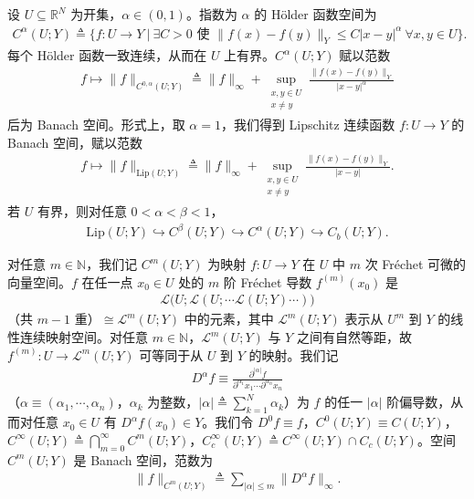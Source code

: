 \documentclass[../../main.tex]{subfiles}%
\begin{document}
\begin{definition}[Hölder 空间]\label{definition:ch04-Holder}
设 $U\subseteq\mathbb{R}^N$ 为开集，$\alpha\in(0,1)$。指数为 $\alpha$ 的 Hölder 函数空间为
\begin{align*}
C^\alpha(U;Y)\triangleq \Big\{f:U\to Y\ \Big|\ \exists C>0\text{ 使 }\|f(x)-f(y)\|_Y\leqslant C|x-y|^\alpha\ \forall x,y\in U\Big\}.
\end{align*}
每个 Hölder 函数一致连续，从而在 $U$ 上有界。$C^\alpha(U;Y)$ 赋以范数
\begin{align*}
f\mapsto\|f\|_{C^{0,\alpha}(U;Y)}\triangleq \|f\|_\infty+\sup_{\substack{x,y\in U\\x\neq y}}\frac{\|f(x)-f(y)\|_Y}{|x-y|^\alpha}
\end{align*}
后为 Banach 空间。形式上，取 $\alpha=1$，我们得到 Lipschitz 连续函数 $f:U\to Y$ 的 Banach 空间，赋以范数
\begin{align*}
f\mapsto\|f\|_{\mathrm{Lip}(U;Y)}\triangleq \|f\|_\infty+\sup_{\substack{x,y\in U\\x\neq y}}\frac{\|f(x)-f(y)\|_Y}{|x-y|}.
\end{align*}
若 $U$ 有界，则对任意 $0<\alpha<\beta<1$，
\begin{align*}
\mathrm{Lip}(U;Y)\hookrightarrow C^\beta(U;Y)\hookrightarrow C^\alpha(U;Y)\hookrightarrow C_b(U;Y).
\end{align*}
\end{definition}

对任意 $m\in\mathbb{N}$，我们记 $C^m(U;Y)$ 为映射 $f:U\to Y$ 在 $U$ 中 $m$ 次 Fréchet 可微的向量空间。$f$ 在任一点 $x_0\in U$ 处的 $m$ 阶 Fréchet 导数 $f^{(m)}(x_0)$ 是
\begin{align*}
\mathcal{L}\big(U;\mathcal{L}(U;\cdots \mathcal{L}(U;Y)\cdots )\big)
\end{align*}
（共 $m-1$ 重）$\cong\mathcal{L}^m(U;Y)$ 中的元素，其中 $\mathcal{L}^m(U;Y)$ 表示从 $U^m$ 到 $Y$ 的线性连续映射空间。对任意 $m\in\mathbb{N}$，$\mathcal{L}^m(U;Y)$ 与 $Y$ 之间有自然等距，故 $f^{(m)}:U\to\mathcal{L}^m(U;Y)$ 可等同于从 $U$ 到 $Y$ 的映射。我们记
\begin{align*}
D^\alpha f\equiv\frac{\partial^{|\alpha|}f}{\partial^{\alpha_1}x_1\cdots\partial^{\alpha_n}x_n}
\end{align*}
（$\alpha\equiv(\alpha_1,\cdots ,\alpha_n)$，$\alpha_k$ 为整数，$|\alpha|\triangleq \sum_{k=1}^N\alpha_k$）为 $f$ 的任一 $|\alpha|$ 阶偏导数，从而对任意 $x_0\in U$ 有 $D^\alpha f(x_0)\in Y$。我们令 $D^0f\equiv f$，$C^0(U;Y)\equiv C(U;Y)$，$C^\infty(U;Y)\triangleq \bigcap_{m=0}^\infty C^m(U;Y)$，$C_c^\infty(U;Y)\triangleq C^\infty(U;Y)\cap C_c(U;Y)$。空间 $C^m(U;Y)$ 是 Banach 空间，范数为
\begin{align*}
\|f\|_{C^m(U;Y)}\triangleq \sum_{|\alpha|\leqslant m}\|D^\alpha f\|_\infty.
\end{align*}
\end{document}
